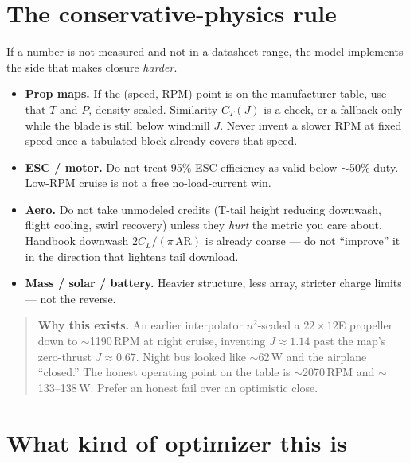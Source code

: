 \documentclass[11pt,letterpaper]{article}
\newenvironment{warningbox}{\begin{quote}\small}{\end{quote}}
\begin{document}
\section{The conservative-physics rule}

If a number is not measured and not in a datasheet range, the model implements the side that makes closure \emph{harder}.

\begin{itemize}
  \item \textbf{Prop maps.} If the (speed, RPM) point is on the manufacturer table, use that $T$ and $P$, density-scaled. Similarity $C_T(J)$ is a check, or a fallback only while the blade is still below windmill $J$. Never invent a slower RPM at fixed speed once a tabulated block already covers that speed.
  \item \textbf{ESC / motor.} Do not treat 95\% ESC efficiency as valid below $\sim$50\% duty. Low-RPM cruise is not a free no-load-current win.
  \item \textbf{Aero.} Do not take unmodeled credits (T-tail height reducing downwash, flight cooling, swirl recovery) unless they \emph{hurt} the metric you care about. Handbook downwash $2C_L/(\pi\,\mathrm{AR})$ is already coarse --- do not ``improve'' it in the direction that lightens tail download.
  \item \textbf{Mass / solar / battery.} Heavier structure, less array, stricter charge limits --- not the reverse.
\end{itemize}

\begin{warningbox}
\textbf{Why this exists.} An earlier interpolator $n^2$-scaled a $22\times12$E propeller down to $\sim$1190\,RPM at night cruise, inventing $J \approx 1.14$ past the map's zero-thrust $J \approx 0.67$. Night bus looked like $\sim$62\,W and the airplane ``closed.'' The honest operating point on the table is $\sim$2070\,RPM and $\sim$133--138\,W. Prefer an honest fail over an optimistic close.
\end{warningbox}

\section{What kind of optimizer this is}
\end{document}
